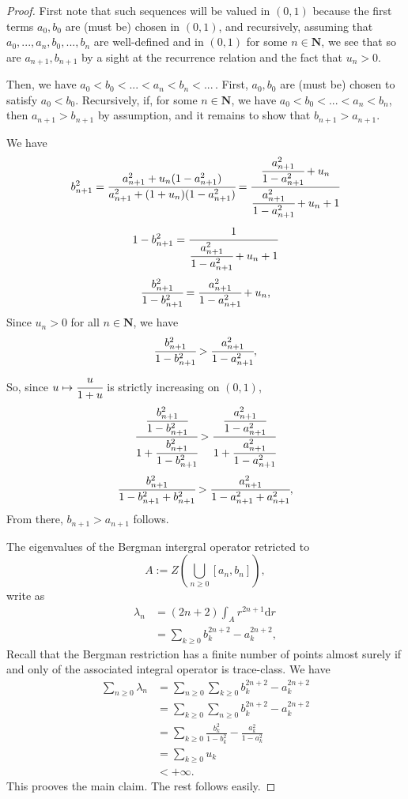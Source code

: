 \documentclass[11pt]{article}
\theoremstyle{plain}
\theoremstyle{definition}
\begin{document}
\begin{proof}
First note that such sequences will be valued in $(0,1)$ because the first terms $ a_0, b_0$ are (must be) chosen in $ (0,1) $, and recursively, assuming that $ a_0, ..., a_n, b_0, ..., b_n $ are well-defined and in $(0,1)$ for some $ n \in \mathbf N$, we see that so are $ a_{n+1}, b_{n+1} $ by a sight at the recurrence relation and the fact that $ u_n > 0 $. 

Then, we have $ a_0 < b_0 < ... < a_n < b_n < ... \,$. First, $ a_0, b_0 $ are (must be) chosen to satisfy $ a_0 < b_0 $. Recursively, if, for some $ n \in \mathbf N $, we have $ a_0 < b_0 < ... < a_n < b_n $, then $ a_{n+1} > b_{n+1} $ by assumption, and it remains to show that $ b_{n+1} > a_{n+1} $.

We have
\[
    b_{n+1}^2 = \cfrac{a_{n+1}^2 + u_n(1-a_{n+1}^2)}{a_{n+1}^2 + (1+u_n)(1-a_{n+1}^2) } = \cfrac{ \cfrac{a_{n+1}^2}{1-a_{n+1}^2} + u_n}{ \cfrac{a_{n+1}^2}{1-a_{n+1}^2} + u_n + 1} 
\]
\[
    1 - b_{n+1}^2 = \cfrac{1}{\cfrac{a_{n+1}^2}{ 1-a_{n+1}^2} + u_n + 1}
\]
\[ 
    \cfrac{b_{n+1}^2}{1 - b_{n+1}^2} = \cfrac{a_{n+1}^2}{1-a_{n+1}^2} + u_n,
\]
Since $ u_n > 0 $ for all $ n \in \mathbf N $, we have
\[
    \cfrac{b_{n+1}^2}{1 - b_{n+1}^2} > \cfrac{a_{n+1}^2}{1-a_{n+1}^2},
\]
So, since $ u \mapsto \cfrac{u}{1+u} $ is strictly increasing on $ (0,1) $, 
\[
    \cfrac{ \cfrac{b_{n+1}^2}{1 - b_{n+1}^2}}{ 1+\cfrac{b_{n+1}^2}{1 - b_{n+1}^2}} > \cfrac{ \cfrac{a_{n+1}^2}{1-a_{n+1}^2}}{ 1+\cfrac{a_{n+1}^2}{1-a_{n+1}^2}}
\]
\[
    \cfrac{b_{n+1}^2}{1-b_{n+1}^2+b_{n+1}^2} > \cfrac{a_{n+1}^2}{1-a_{n+1}^2+a_{n+1}^2},
\]
From there, $ b_{n+1} > a_{n+1} $ follows.

The eigenvalues of the Bergman intergral operator retricted to 
\[
    A := Z\left( \bigcup_{n \ge 0} [a_n, b_n]\right),
\]
write as
\begin{align*}
    \lambda_n &= (2n+2) \int_A r^{2n+1} \mathrm d r \\
    &= \sum_{k \ge 0} b_k^{2n+2} - a_k^{2n+2},
\end{align*}
Recall that the Bergman restriction has a finite number of points almost surely if and only of the associated integral operator is trace-class. We have
\begin{align*}
    \sum_{n \ge 0} \lambda_n &= \sum_{n \ge 0} \sum_{k \ge 0} b_k^{2n+2} - a_k^{2n+2} \\
    &= \sum_{k \ge 0} \sum_{n \ge 0} b_k^{2n+2} - a_k^{2n+2} \\
    &= \sum_{k \ge 0} \frac{b_k^2}{1-b_k^2} - \frac{a_k^2}{1-a_k^2} \\
    &= \sum_{k \ge 0} u_k  \\
    &< +\infty.
\end{align*}
This prooves the main claim. The rest follows easily.
\end{proof}
\end{document}
